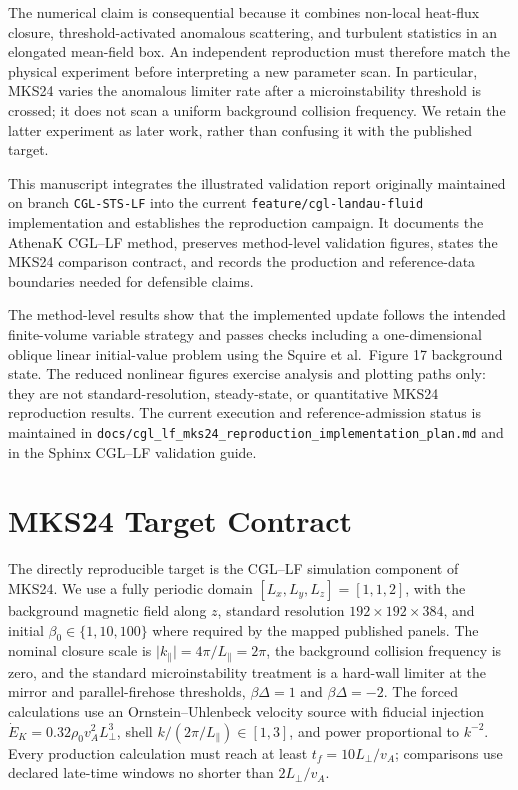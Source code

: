 \documentclass[11pt]{article}
\begin{document}
The numerical claim is consequential because it combines non-local
heat-flux closure, threshold-activated anomalous scattering, and turbulent
statistics in an elongated mean-field box.  An independent reproduction must
therefore match the physical experiment before interpreting a new parameter
scan.  In particular, MKS24 varies the anomalous limiter rate after a
microinstability threshold is crossed; it does not scan a uniform background
collision frequency.  We retain the latter experiment as later work, rather
than confusing it with the published target.

This manuscript integrates the illustrated validation report originally
maintained on branch \texttt{CGL-STS-LF} into the current
\texttt{feature/cgl-landau-fluid} implementation and establishes the
reproduction campaign.  It documents the AthenaK CGL--LF method, preserves
method-level validation figures, states the MKS24 comparison contract, and
records the production and reference-data boundaries needed for defensible
claims.

The method-level results show that the implemented update follows the intended
finite-volume variable strategy and passes checks including a
one-dimensional oblique linear initial-value problem using the Squire et
al.\ Figure 17 background state.  The reduced nonlinear figures exercise
analysis and plotting paths only: they are not standard-resolution,
steady-state, or quantitative MKS24 reproduction results.  The current
execution and reference-admission status is maintained in
\texttt{docs/cgl\_lf\_mks24\_reproduction\_implementation\_plan.md} and in
the Sphinx CGL--LF validation guide.

\section{MKS24 Target Contract}

The directly reproducible target is the CGL--LF simulation component of MKS24.
We use a fully periodic domain
\([L_x,L_y,L_z]=[1,1,2]\), with the background magnetic field along \(z\),
standard resolution \(192\times192\times384\), and initial
\(\beta_0\in\{1,10,100\}\) where required by the mapped published panels.
The nominal closure scale is
\(\lvert k_\parallel\rvert=4\pi/L_\parallel=2\pi\), the background collision
frequency is zero, and the standard microinstability treatment is a hard-wall
limiter at the mirror and parallel-firehose thresholds,
\(\beta\Delta=1\) and \(\beta\Delta=-2\).  The forced calculations use an
Ornstein--Uhlenbeck velocity source with fiducial injection
\(\dot E_K=0.32\rho_0v_A^2L_\perp^3\), shell
\(k/(2\pi/L_\parallel)\in[1,3]\), and power proportional to \(k^{-2}\).
Every production calculation must reach at least
\(t_f=10L_\perp/v_A\); comparisons use declared late-time windows no shorter
than \(2L_\perp/v_A\).
\end{document}
